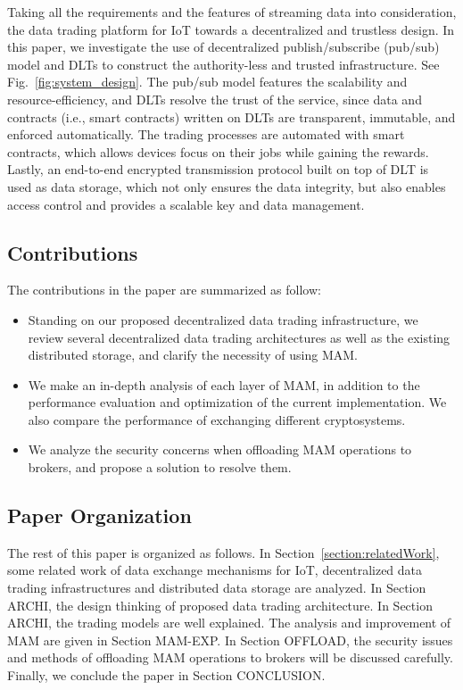 \documentclass[conference]{IEEEtran}
\begin{document}
Taking all the requirements and the features of streaming data into consideration, the data trading platform for IoT towards a decentralized and trustless design. In this paper, we investigate the use of decentralized publish/subscribe (pub/sub) model and DLTs to construct the authority-less and trusted infrastructure. See Fig.~\ref{fig:system_design}. The pub/sub model features the scalability and resource-efficiency, and DLTs resolve the trust of the service, since data and contracts (i.e., smart contracts) written on DLTs are transparent, immutable, and enforced automatically. The trading processes are automated with smart contracts, which allows devices focus on their jobs while gaining the rewards. Lastly, an end-to-end encrypted transmission protocol built on top of DLT is used as data storage, which not only ensures the data integrity, but also enables access control and provides a scalable key and data management.

\subsection{Contributions}
The contributions in the paper are summarized as follow:
\begin{itemize}
	\item Standing on our proposed decentralized data trading infrastructure, we review several decentralized data trading architectures as well as the existing distributed storage, and clarify the necessity of using MAM.  
    \item We make an in-depth analysis of each layer of MAM, in addition to the performance evaluation and optimization of the current implementation. We also compare the performance of exchanging different cryptosystems.
	\item We analyze the security concerns when offloading MAM operations to brokers, and propose a solution to resolve them.
\end{itemize}


\subsection{Paper Organization}
The rest of this paper is organized as follows. In Section~\ref{section:relatedWork}, some related work of data exchange mechanisms for IoT, decentralized data trading infrastructures and distributed data storage are analyzed. In Section ARCHI, the design thinking of proposed data trading architecture. In Section ARCHI, the trading models are well explained. The analysis and improvement of MAM are given in Section MAM-EXP. In Section OFFLOAD, the security issues and methods of offloading MAM operations to brokers will be discussed carefully. Finally, we conclude the paper in Section CONCLUSION.
\end{document}
